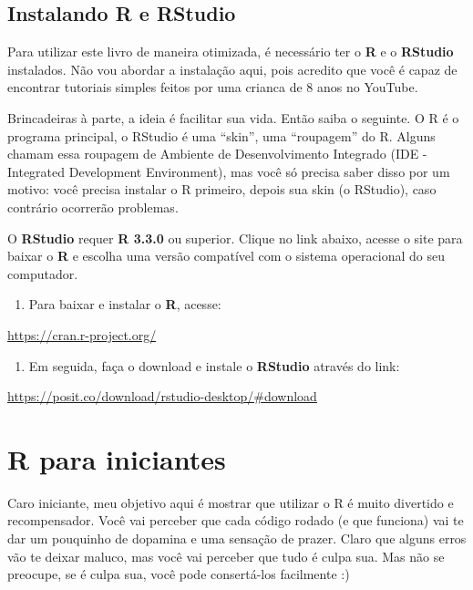 \documentclass[
]{book}
\providecommand{\tightlist}{%
  \setlength{\itemsep}{0pt}\setlength{\parskip}{0pt}}
\begin{document}
\hypertarget{instalando-r-e-rstudio}{%
\section{Instalando R e RStudio}\label{instalando-r-e-rstudio}}

Para utilizar este livro de maneira otimizada, é necessário ter o \textbf{R} e o \textbf{RStudio} instalados. Não vou abordar a instalação aqui, pois acredito que você é capaz de encontrar tutoriais simples feitos por uma crianca de 8 anos no YouTube.

Brincadeiras à parte, a ideia é facilitar sua vida. Então saiba o seguinte. O R é o programa principal, o RStudio é uma ``skin'', uma ``roupagem'' do R. Alguns chamam essa roupagem de Ambiente de Desenvolvimento Integrado (IDE - Integrated Development Environment), mas você só precisa saber disso por um motivo: você precisa instalar o R primeiro, depois sua skin (o RStudio), caso contrário ocorrerão problemas.

O \textbf{RStudio} requer \textbf{R 3.3.0} ou superior. Clique no link abaixo, acesse o site para baixar o \textbf{R} e escolha uma versão compatível com o sistema operacional do seu computador.

\begin{enumerate}
\def\labelenumi{\arabic{enumi}.}
\tightlist
\item
  Para baixar e instalar o \textbf{R}, acesse:
\end{enumerate}

\url{https://cran.r-project.org/}

\begin{enumerate}
\def\labelenumi{\arabic{enumi}.}
\setcounter{enumi}{1}
\tightlist
\item
  Em seguida, faça o download e instale o \textbf{RStudio} através do link:
\end{enumerate}

\url{https://posit.co/download/rstudio-desktop/\#download}

\hypertarget{r-para-iniciantes}{%
\chapter{R para iniciantes}\label{r-para-iniciantes}}

Caro iniciante, meu objetivo aqui é mostrar que utilizar o R é muito divertido e recompensador. Você vai perceber que cada código rodado (e que funciona) vai te dar um pouquinho de dopamina e uma sensação de prazer. Claro que alguns erros vão te deixar maluco, mas você vai perceber que tudo é culpa sua. Mas não se preocupe, se é culpa sua, você pode consertá-los facilmente :)
\end{document}
